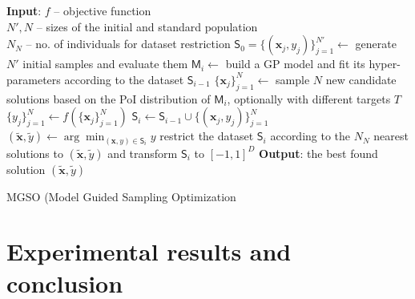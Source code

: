 \documentclass{itatnew}
\newcommand{\xx}{\mathrm{\mathbf{x}}}
\begin{document}
\begin{algorithm}[t]
\begin{algorithmic}[1]
{\small
  \STATE \textbf{Input}: $f$ -- objective function \\
      \quad $N', N$ -- sizes of the initial and standard population \\
      \quad $N_N$ -- no. of individuals for dataset restriction
  \STATE $\mathsf{S}_0 = \{(\xx_j, y_j)\}_{j=1}^{N'} \leftarrow$ generate $N'$ initial samples 
      and evaluate them %
    \STATE $\mathsf{M}_i \leftarrow$ build a GP model and fit its hyper-parameters
        according to the dataset $\mathsf{S}_{i-1}$
    \STATE $\{\xx_j\}_{j=1}^N  \leftarrow$ sample $N$ new candidate solutions based
        on the PoI distribution of $\mathsf{M}_i$, optionally with
        different targets $T$
    \STATE $\{y_j\}_{j=1}^N \leftarrow f(\{\xx_j\}_{j=1}^N)$  \hspace{\fill}   
    \STATE $\mathsf{S}_i \leftarrow \mathsf{S}_{i-1} \cup \{(\xx_j, y_j)\}_{j=1}^N$  \hspace{\fill}   
    \STATE $(\tilde{\xx}, \tilde{y}) \leftarrow \arg \min_{(\xx,y) \in \mathsf{S}_i} y$  \hspace{\fill}  
    \STATE restrict the dataset $\mathsf{S}_i$ according to the $N_N$ nearest solutions to $(\tilde{\xx},\tilde{y})$ and transform $\mathsf{S}_i$ to $[-1, 1]^D$
    \ENDIF
  \ENDWHILE
  \STATE \textbf{Output}: the best found solution $(\tilde{\xx}, \tilde{y})$
}
\end{algorithmic}
\caption{MGSO (Model Guided Sampling Optimization}
\label{alg:mgso}
\end{algorithm}

\section{Experimental results and conclusion}
\label{sec:results}
\end{document}
